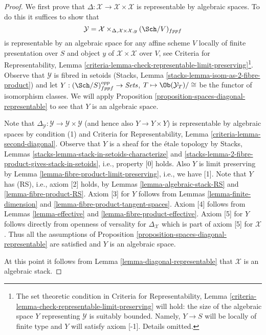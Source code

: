 \begin{proof}
We first prove that $\Delta : \mathcal{X} \to \mathcal{X} \times \mathcal{X}$
is representable by algebraic spaces. To do this it suffices to show
that
$$
\mathcal{Y} =
\mathcal{X} \times_{\Delta, \mathcal{X} \times \mathcal{X}, y} (\Sch/V)_{fppf}
$$
is representable by an algebraic space for any affine scheme $V$ locally
of finite presentation over $S$ and object $y$ of
$\mathcal{X} \times \mathcal{X}$ over $V$, see
Criteria for Representability, Lemma
\ref{criteria-lemma-check-representable-limit-preserving}\footnote{The
set theoretic condition in Criteria for Representability, Lemma
\ref{criteria-lemma-check-representable-limit-preserving}
will hold: the size of the algebraic space $Y$ representing $\mathcal{Y}$ is
suitably bounded. Namely, $Y \to S$ will be locally of finite type and $Y$
will satisfy axiom [-1]. Details omitted.}.
Observe that $\mathcal{Y}$ is fibred in setoids
(Stacks, Lemma \ref{stacks-lemma-isom-as-2-fibre-product})
and let $Y : (\Sch/S)_{fppf}^{opp} \to \textit{Sets}$,
$T \mapsto \Ob(\mathcal{Y}_T)/\cong$ be the functor of isomorphism
classes. We will apply
Proposition \ref{proposition-spaces-diagonal-representable}
to see that $Y$ is an algebraic space.

\medskip\noindent
Note that
$\Delta_\mathcal{Y} : \mathcal{Y} \to \mathcal{Y} \times \mathcal{Y}$
(and hence also $Y \to Y \times Y$)
is representable by algebraic spaces by condition (1) and
Criteria for Representability, Lemma \ref{criteria-lemma-second-diagonal}.
Observe that $Y$ is a sheaf for the \'etale topology by
Stacks, Lemmas \ref{stacks-lemma-stack-in-setoids-characterize} and
\ref{stacks-lemma-2-fibre-product-gives-stack-in-setoids}, i.e.,
property [0] holds. Also $Y$ is limit preserving by
Lemma \ref{lemma-fibre-product-limit-preserving}, i.e., we have [1].
Note that $Y$ has (RS), i.e., axiom [2] holds, by
Lemmas \ref{lemma-algebraic-stack-RS} and
\ref{lemma-fibre-product-RS}. Axiom [3] for $Y$ follows
from Lemmas \ref{lemma-finite-dimension} and
\ref{lemma-fibre-product-tangent-spaces}.
Axiom [4] follows from Lemmas \ref{lemma-effective} and
\ref{lemma-fibre-product-effective}.
Axiom [5] for $Y$ follows directly from openness of versality
for $\Delta_\mathcal{X}$ which is part of axiom [5] for $\mathcal{X}$.
Thus all the assumptions of
Proposition \ref{proposition-spaces-diagonal-representable}
are satisfied and $Y$ is an algebraic space.

\medskip\noindent
At this point it follows from Lemma \ref{lemma-diagonal-representable}
that $\mathcal{X}$ is an algebraic stack.
\end{proof}







